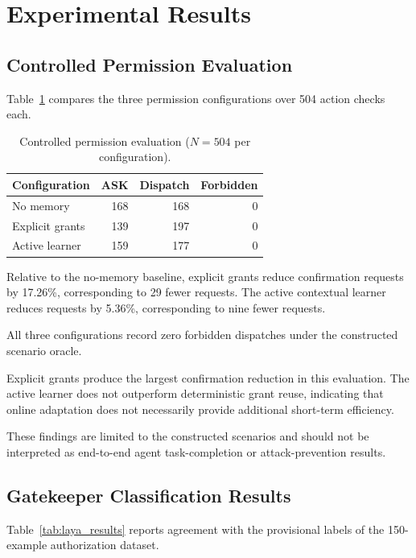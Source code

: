 \documentclass[10pt,conference]{IEEEtran}
\begin{document}
\section{Experimental Results}
\label{sec:results}

\subsection{Controlled Permission Evaluation}

Table~\ref{tab:permission_results} compares
the three permission configurations over
504 action checks each.

\begin{table}[!t]
\centering
\caption{Controlled permission evaluation
($N=504$ per configuration).}
\label{tab:permission_results}
\footnotesize
\setlength{\tabcolsep}{3pt}
\begin{tabular}{lrrr}
\toprule
Configuration & ASK & Dispatch & Forbidden \\
\midrule
No memory       & 168 & 168 & 0 \\
Explicit grants & 139 & 197 & 0 \\
Active learner  & 159 & 177 & 0 \\
\bottomrule
\end{tabular}
\end{table}

Relative to the no-memory baseline,
explicit grants reduce confirmation requests
by 17.26\%, corresponding to 29 fewer
requests. The active contextual learner
reduces requests by 5.36\%, corresponding
to nine fewer requests.

All three configurations record zero
forbidden dispatches under the constructed
scenario oracle.

Explicit grants produce the largest
confirmation reduction in this evaluation.
The active learner does not outperform
deterministic grant reuse, indicating that
online adaptation does not necessarily
provide additional short-term efficiency.

These findings are limited to the
constructed scenarios and should not
be interpreted as end-to-end agent
task-completion or attack-prevention results.

\subsection{Gatekeeper Classification Results}

Table~\ref{tab:laya_results} reports
agreement with the provisional labels
of the 150-example authorization dataset.
\end{document}

